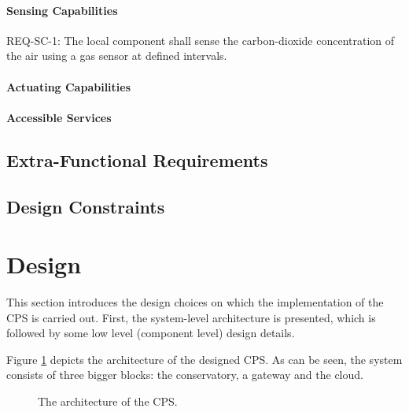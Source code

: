 \documentclass[a4paper, 11pt]{article}
\begin{document}
	\paragraph{Sensing Capabilities}
	REQ-SC-1: The local component shall sense the carbon-dioxide concentration of the air using a gas sensor at defined intervals.
	\paragraph{Actuating Capabilities}
	
	\paragraph{Accessible Services}
	
	\subsection{Extra-Functional Requirements}
	
	\subsection{Design Constraints}
	
	\section{Design}
	\label{sec:design}
	This section introduces the design	choices on which the implementation of the CPS is carried out. First, the system-level architecture is presented, which is followed by some low level (component level) design details.
	
	Figure \ref{fig:architecture} depicts the architecture of the designed CPS. As can be seen, the system consists of three bigger blocks: the conservatory, a gateway and the cloud. 
		
		\begin{figure}[h!]
			\center
			\caption{The architecture of the CPS.}
			\label{fig:architecture}
		\end{figure}
\end{document}
